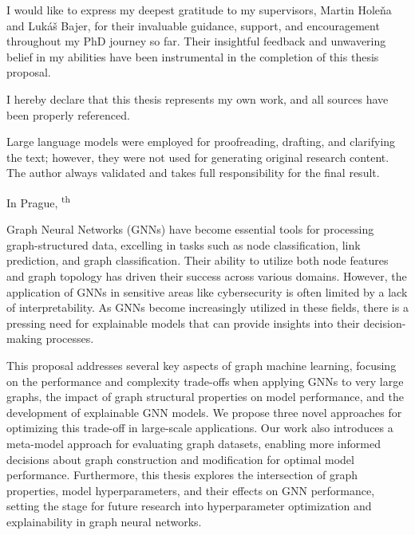 \begin{thanks}
	I would like to express my deepest gratitude to my supervisors, Martin Holeňa and Lukáš Bajer, for their invaluable guidance, support, and encouragement throughout my PhD journey so far. Their insightful feedback and unwavering belief in my abilities have been instrumental in the completion of this thesis proposal.
\end{thanks}

\begin{declaration}
	I hereby declare that this thesis represents my own work, and all sources have been properly referenced.

	Large language models were employed for proofreading, drafting, and clarifying the text; however, they were not used for generating original research content. The author always validated and takes full responsibility for the final result.

	In Prague, \textsuperscript{th}~~
\end{declaration}

\begin{abstract-english}
	Graph Neural Networks (GNNs) have become essential tools for processing graph-structured data, excelling in tasks such as node classification, link prediction, and graph classification. Their ability to utilize both node features and graph topology has driven their success across various domains. However, the application of GNNs in sensitive areas like cybersecurity is often limited by a lack of interpretability. As GNNs become increasingly utilized in these fields, there is a pressing need for explainable models that can provide insights into their decision-making processes.

	This proposal addresses several key aspects of graph machine learning, focusing on the performance and complexity trade-offs when applying GNNs to very large graphs, the impact of graph structural properties on model performance, and the development of explainable GNN models. We propose three novel approaches for optimizing this trade-off in large-scale applications. Our work also introduces a meta-model approach for evaluating graph datasets, enabling more informed decisions about graph construction and modification for optimal model performance. Furthermore, this thesis explores the intersection of graph properties, model hyperparameters, and their effects on GNN performance, setting the stage for future research into hyperparameter optimization and explainability in graph neural networks.
\end{abstract-english}

